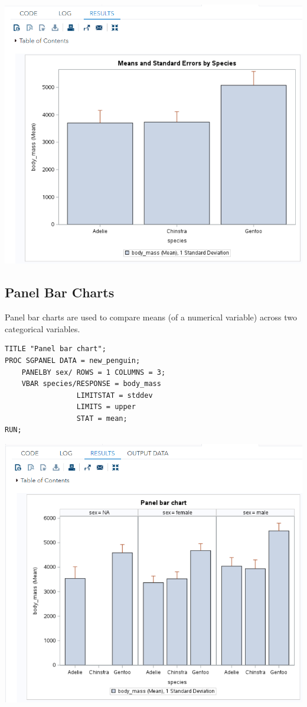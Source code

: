 \documentclass[
]{book}
\begin{document}
\begin{center}\includegraphics[width=1\linewidth]{img06/w06-ErrorBar} \end{center}

\hypertarget{panel-bar-charts}{%
\subsection{Panel Bar Charts}\label{panel-bar-charts}}

Panel bar charts are used to compare means (of a numerical variable) across two categorical variables.

\begin{verbatim}
TITLE "Panel bar chart";
PROC SGPANEL DATA = new_penguin;
    PANELBY sex/ ROWS = 1 COLUMNS = 3;
    VBAR species/RESPONSE = body_mass
                 LIMITSTAT = stddev
                 LIMITS = upper 
                 STAT = mean; 
RUN;
\end{verbatim}

\begin{center}\includegraphics[width=1\linewidth]{img06/w06-PanelBarChart} \end{center}
\end{document}
